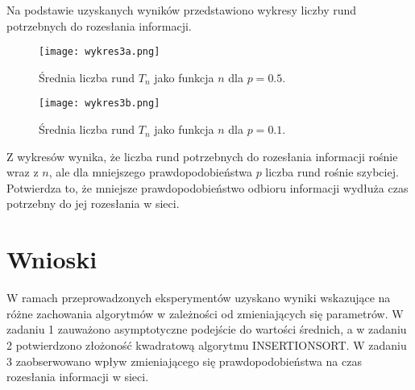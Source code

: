 \documentclass{article}
\begin{document}
Na podstawie uzyskanych wyników przedstawiono wykresy liczby rund potrzebnych do rozesłania informacji.

\begin{figure}[ht]
    \centering
    \texttt{[image: wykres3a.png]}
    \caption{Średnia liczba rund \(T_n\) jako funkcja \(n\) dla \(p = 0.5\).}
    \label{fig:wykres3a}
\end{figure}

\begin{figure}[ht]
    \centering
    \texttt{[image: wykres3b.png]}
    \caption{Średnia liczba rund \(T_n\) jako funkcja \(n\) dla \(p = 0.1\).}
    \label{fig:wykres3b}
\end{figure}

Z wykresów wynika, że liczba rund potrzebnych do rozesłania informacji rośnie wraz z \(n\), ale dla mniejszego prawdopodobieństwa \(p\) liczba rund rośnie szybciej. Potwierdza to, że mniejsze prawdopodobieństwo odbioru informacji wydłuża czas potrzebny do jej rozesłania w sieci.

\section*{Wnioski}

W ramach przeprowadzonych eksperymentów uzyskano wyniki wskazujące na różne zachowania algorytmów w zależności od zmieniających się parametrów. W zadaniu 1 zauważono asymptotyczne podejście do wartości średnich, a w zadaniu 2 potwierdzono złożoność kwadratową algorytmu INSERTIONSORT. W zadaniu 3 zaobserwowano wpływ zmieniającego się prawdopodobieństwa na czas rozesłania informacji w sieci.
\end{document}
